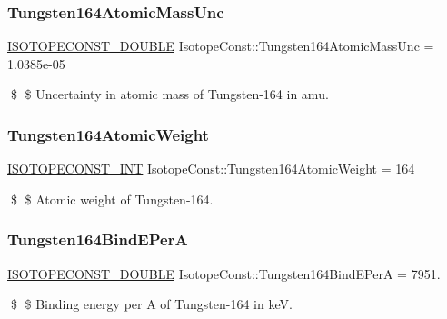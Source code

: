 \subsubsection{\texorpdfstring{Tungsten164\+Atomic\+Mass\+Unc}{Tungsten164AtomicMassUnc}}
{\footnotesize\ttfamily \mbox{\hyperlink{group___isotope_const-_macros_ga8f45a7272ce02c0b4c65c44636ed719a}{I\+S\+O\+T\+O\+P\+E\+C\+O\+N\+S\+T\+\_\+\+D\+O\+U\+B\+LE}} Isotope\+Const\+::\+Tungsten164\+Atomic\+Mass\+Unc = 1.\+0385e-\/05}

\$ \$ Uncertainty in atomic mass of Tungsten-\/164 in amu. \mbox{\label{group___isotope_const-_tungsten-_w164_ga326366152b40bc3bae52b2a3ef8b17d1}} 
\subsubsection{\texorpdfstring{Tungsten164\+Atomic\+Weight}{Tungsten164AtomicWeight}}
{\footnotesize\ttfamily \mbox{\hyperlink{group___isotope_const-_macros_ga5f18360b3e99483a35c32d789e62621c}{I\+S\+O\+T\+O\+P\+E\+C\+O\+N\+S\+T\+\_\+\+I\+NT}} Isotope\+Const\+::\+Tungsten164\+Atomic\+Weight = 164}

\$ \$ Atomic weight of Tungsten-\/164. \mbox{\label{group___isotope_const-_tungsten-_w164_gabfed9f3d0a72c04c98b14870a92c0a7e}} 
\subsubsection{\texorpdfstring{Tungsten164\+Bind\+E\+PerA}{Tungsten164BindEPerA}}
{\footnotesize\ttfamily \mbox{\hyperlink{group___isotope_const-_macros_ga8f45a7272ce02c0b4c65c44636ed719a}{I\+S\+O\+T\+O\+P\+E\+C\+O\+N\+S\+T\+\_\+\+D\+O\+U\+B\+LE}} Isotope\+Const\+::\+Tungsten164\+Bind\+E\+PerA = 7951.}

\$ \$ Binding energy per A of Tungsten-\/164 in keV. \mbox{\label{group___isotope_const-_tungsten-_w164_ga7075638118b387a7e746304d2749e3c0}} 
